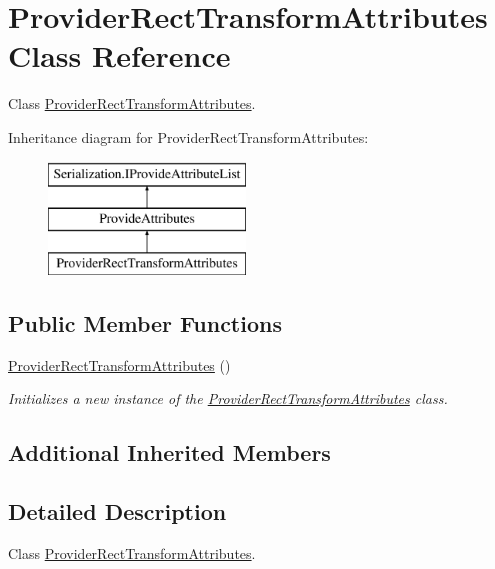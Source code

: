 \hypertarget{class_provider_rect_transform_attributes}{}\section{Provider\+Rect\+Transform\+Attributes Class Reference}
\label{class_provider_rect_transform_attributes}


Class \hyperlink{class_provider_rect_transform_attributes}{Provider\+Rect\+Transform\+Attributes}.  


Inheritance diagram for Provider\+Rect\+Transform\+Attributes\+:\begin{figure}[H]
\begin{center}
\leavevmode
\includegraphics[height=3.000000cm]{class_provider_rect_transform_attributes}
\end{center}
\end{figure}
\subsection*{Public Member Functions}
\begin{DoxyCompactItemize}
\item 
\hyperlink{class_provider_rect_transform_attributes_af3af6982a65f46ed0caeed648dba3185}{Provider\+Rect\+Transform\+Attributes} ()
\begin{DoxyCompactList}\small\item\em Initializes a new instance of the \hyperlink{class_provider_rect_transform_attributes}{Provider\+Rect\+Transform\+Attributes} class. \end{DoxyCompactList}\end{DoxyCompactItemize}
\subsection*{Additional Inherited Members}


\subsection{Detailed Description}
Class \hyperlink{class_provider_rect_transform_attributes}{Provider\+Rect\+Transform\+Attributes}. 



